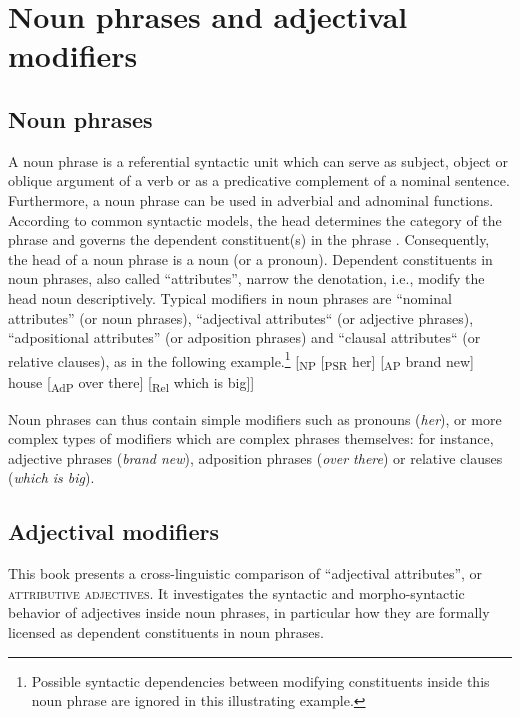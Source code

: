 
\chapter{Noun phrases and adjectival modifiers}

\section{Noun phrases}
A noun phrase is a referential syntactic unit which can serve as subject, object or oblique argument of a verb or as a predicative complement of a nominal sentence. Furthermore, a noun phrase can be used in adverbial and adnominal functions. According to common syntactic models, the head determines the category of the phrase and governs the dependent constituent(s) in the phrase \citep[cf.][57]{nichols1986}. Consequently, the head of a noun phrase is a noun (or a pronoun). Dependent constituents in noun phrases, also called “attributes”, narrow the denotation, i.e., modify the head noun descriptively. %
 Typical modifiers in noun phrases are “nominal attributes” (or noun phrases), “adjectival attributes“ (or adjective phrases), “adpositional attributes” (or adposition phrases) and “clausal attributes“ (or relative clauses), as in the following example.\footnote{Possible syntactic dependencies between modifying constituents inside this noun phrase are ignored in this illustrating example.}
\ea 
{\upshape [}\textsubscript{\rm NP} {\upshape [}\textsubscript{\rm PSR} her{\upshape ]} {\upshape [}\textsubscript{\rm AP} brand new{\upshape ]} house {\upshape [}\textsubscript{\rm AdP} over there{\upshape ]} {\upshape [}\textsubscript{\rm Rel} which is big{\upshape ]]}
\z

Noun phrases can thus contain simple modifiers such as pronouns (\textit{her}), or more complex types of modifiers which are complex phrases themselves: for instance, adjective phrases (\textit{brand new}), adposition phrases (\textit{over there}) or relative clauses (\textit{which is big}).

\section{Adjectival modifiers}
This book presents a cross-linguistic comparison of “adjectival attributes”, or \textsc{attributive adjectives}. It investigates the syntactic and morpho-syntactic behavior of adjectives inside noun phrases, in particular how they are formally licensed as dependent constituents in noun phrases.


